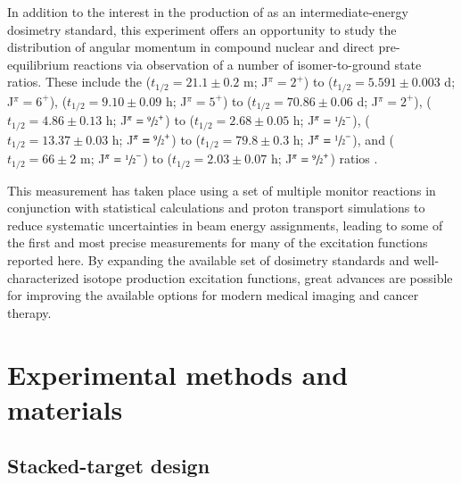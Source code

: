 \documentclass[3p]{elsarticle}
\newcommand{\comment}[1]{\todo[color=blue!20!white,inline]{ASV: #1}}
\begin{document}
In addition to the interest in the production of  as an intermediate-energy dosimetry standard, this experiment offers an opportunity to study the distribution of angular momentum in compound nuclear and direct pre-equilibrium reactions via observation of a number of isomer-to-ground state ratios.
These include the  ($t_{1/2}=21.1\pm0.2$ m; J$^\pi=2^+$) to   ($t_{1/2}=5.591\pm0.003$ d; J$^\pi=6^+$),  ($t_{1/2}=9.10\pm0.09$ h; J$^\pi=5^+$) to   ($t_{1/2}=70.86\pm0.06$ d; J$^\pi=2^+$),   ($t_{1/2}=4.86\pm0.13$ h; J$^\pi=\sfrac{9}{2}^+$) to   ($t_{1/2}=2.68\pm0.05$ h; J$^\pi=\sfrac{1}{2}^-$),   ($t_{1/2}=13.37\pm0.03$ h; J$^\pi=\sfrac{9}{2}^+$) to   ($t_{1/2}=79.8\pm0.3$ h; J$^\pi=\sfrac{1}{2}^-$),  and  ($t_{1/2}=66\pm2$ m; J$^\pi=\sfrac{1}{2}^-$) to   ($t_{1/2}=2.03\pm0.07$ h; J$^\pi=\sfrac{9}{2}^+$)  ratios \cite{Dong2015,Nesaraja2010,Singh2014,Johnson2015,Singh2013}.  
 
 
This measurement has taken place using a set of multiple monitor reactions in conjunction with statistical calculations and proton transport simulations to reduce systematic uncertainties in beam energy assignments, leading to some of the first and most precise measurements  for many of the excitation functions reported here. 
By expanding the available set of dosimetry standards and well-characterized isotope production excitation functions, great advances are possible for improving the  available options for modern medical imaging and cancer therapy.

 
 
 


\section{Experimental methods and materials}\label{sec:experiment}



\subsection{Stacked-target design }\label{sec:target_design}

\end{document}
